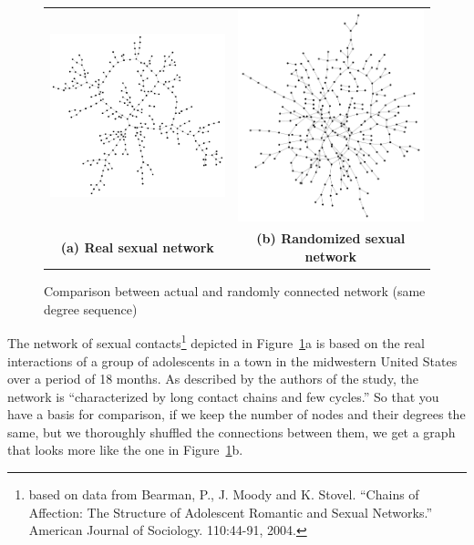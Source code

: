 \documentclass{article}
\begin{document}
\UndefineShortVerb{\|}
\begin{figure}[!ht]

\begin{center}
\begin{tabular}{cc}
\includegraphics[width = 3in]{sexual_net.pdf} &\includegraphics[width = 3in]{shuffled_sex.pdf}\\
\textbf{(a) Real sexual network} & \textbf{(b) Randomized sexual network}\\
\end{tabular}
\caption{Comparison between actual and randomly connected network (same degree sequence)}
\label{sex_fig}
\end{center}
\end{figure}
\DefineShortVerb{\|}

The network of sexual contacts\footnote{based on data from Bearman, P., J. Moody and K. Stovel. ``Chains of Affection: The 
Structure of Adolescent Romantic and Sexual Networks.'' American Journal of Sociology. 110:44-91, 2004.} depicted in Figure~\ref{sex_fig}a is based on the real interactions of a 
group of adolescents in a town in the midwestern United States over a period of 18 months.  As described by the authors of the study, the network is
``characterized by long contact chains and few cycles.''  So that you have a basis for comparison, if we keep the number of nodes and their degrees the same,
but we thoroughly shuffled the connections between them, we get a graph that looks more like the one in Figure~\ref{sex_fig}b.
\end{document}
